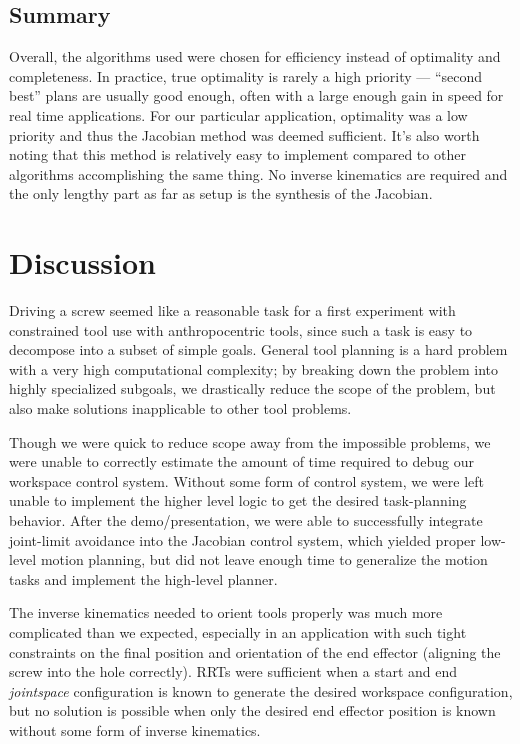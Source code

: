 \documentclass[10pt, conference]{IEEEtran}
\begin{document}
\subsection{Summary}
\label{sec-5-4}


   Overall, the algorithms used were chosen for efficiency instead of
   optimality and completeness. In practice, true optimality is rarely
   a high priority — “second best” plans are usually good enough, often
   with a large enough gain in speed for real time applications. For
   our particular application, optimality was a low priority and thus
   the Jacobian method was deemed sufficient. It’s also worth noting
   that this method is relatively easy to implement compared to other
   algorithms accomplishing the same thing. No inverse kinematics are
   required and the only lengthy part as far as setup is the synthesis
   of the Jacobian.
\section{Discussion}
\label{sec-6}

   Driving a screw seemed like a reasonable task for a first experiment
   with constrained tool use with anthropocentric tools, since such a
   task is easy to decompose into a subset of simple goals. General tool
   planning is a hard problem with a very high computational complexity;
   by breaking down the problem into highly specialized subgoals, we
   drastically reduce the scope of the problem, but also make solutions
   inapplicable to other tool problems.

   Though we were quick to reduce scope away from the impossible
   problems, we were unable to correctly estimate the amount of time
   required to debug our workspace control system.  Without some form of
   control system, we were left unable to implement the higher level
   logic to get the desired task-planning behavior. After the
   demo/presentation, we were able to successfully integrate joint-limit
   avoidance into the Jacobian control system, which yielded proper
   low-level motion planning, but did not leave enough time to
   generalize the motion tasks and implement the high-level planner.

   The inverse kinematics needed to orient tools properly was much more
   complicated than we expected, especially in an application with such
   tight constraints on the final position and orientation of the end
   effector (aligning the screw into the hole correctly). RRTs were
   sufficient when a start and end \emph{jointspace} configuration is
   known to generate the desired workspace configuration, but no
   solution is possible when only the desired end effector position is
   known without some form of inverse kinematics.
\end{document}
